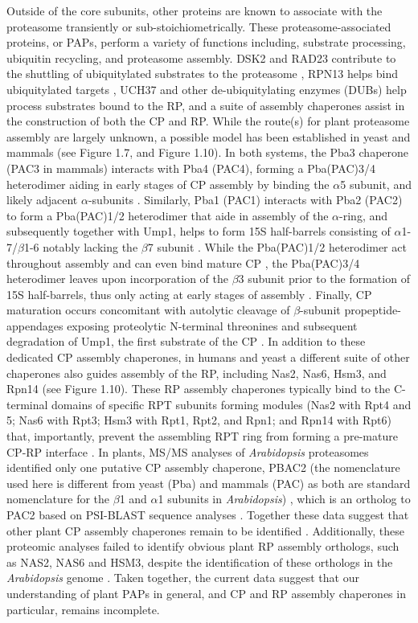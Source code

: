 Outside of the core subunits, other proteins are known to associate with the proteasome transiently or sub-stoichiometrically. These proteasome-associated proteins, or PAPs, perform a variety of functions including, substrate processing, ubiquitin recycling, and proteasome assembly. DSK2 and RAD23 contribute to the shuttling of ubiquitylated substrates to the proteasome \citep{farmer10, fatimababy10, lin11}, RPN13 helps bind ubiquitylated targets \citep{schreiner08}, UCH37 and other de-ubiquitylating enzymes (DUBs) \citep{vanderlinden15} help process substrates bound to the RP, and a suite of assembly chaperones assist in the construction of both the CP and RP.  While the route(s) for plant proteasome assembly are largely unknown, a possible model has been established in yeast and mammals (see Figure 1.7, and Figure 1.10). In both systems, the Pba3 chaperone (PAC3 in mammals) interacts with Pba4 (PAC4), forming a Pba(PAC)3/4 heterodimer aiding in early stages of CP assembly by binding the $\alpha$5 subunit, and likely adjacent $\alpha$-subunits  \citep{kunjappu14, yashiroda08}. Similarly, Pba1 (PAC1) interacts with Pba2 (PAC2) to form a Pba(PAC)1/2 heterodimer that aide in assembly of the $\alpha$-ring, and subsequently together with Ump1, helps to form 15S half-barrels consisting of $\alpha$1-7/$\beta$1-6 notably lacking the $\beta$7 subunit \citep{kunjappu14, marques07}. While the Pba(PAC)1/2 heterodimer act throughout assembly and can even bind mature CP \citep{stadtmueller12}, the Pba(PAC)3/4 heterodimer leaves upon incorporation of the $\beta$3 subunit prior to the formation of 15S half-barrels, thus only acting at early stages of assembly \citep{hirano08}. Finally, CP maturation occurs concomitant with autolytic cleavage of $\beta$-subunit propeptide-appendages exposing proteolytic N-terminal threonines and subsequent degradation of Ump1, the first substrate of the CP \citep{ramos98}. In addition to these dedicated CP assembly chaperones, in humans and yeast a different suite of other chaperones also guides assembly of the RP, including Nas2, Nas6, Hsm3, and Rpn14 (see Figure 1.10). These RP assembly chaperones typically bind to the C-terminal domains of specific RPT subunits forming modules (Nas2 with Rpt4 and 5; Nas6 with Rpt3; Hsm3 with Rpt1, Rpt2, and Rpn1; and Rpn14 with Rpt6) that, importantly, prevent the assembling RPT ring from forming a pre-mature CP-RP interface \citep{park10}.  In plants, MS/MS analyses of \textit{Arabidopsis} proteasomes identified only one putative CP assembly chaperone, PBAC2 (the nomenclature used here is different from yeast (Pba) and mammals (PAC) as both are standard nomenclature for the $\beta$1 and $\alpha$1 subunits in \textit{Arabidopsis}) \citep{book10}, which is an ortholog to PAC2 based on PSI-BLAST sequence analyses \citep{kusmierczyk11, le07}. Together these data suggest that other plant CP assembly chaperones remain to be identified \citep{book10}.  Additionally, these proteomic analyses failed to identify obvious plant RP assembly orthologs, such as NAS2, NAS6 and HSM3, despite the identification of these orthologs in the \textit{Arabidopsis} genome \citep{book10}. Taken together, the current data suggest that our understanding of plant PAPs in general, and CP and RP assembly chaperones in particular, remains incomplete.

